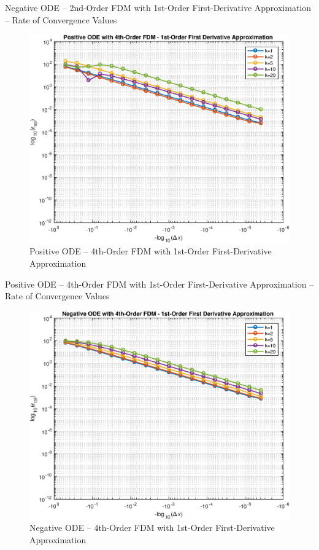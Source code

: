 \documentclass[10pt, reqno]{article}		%
\numberwithin{equation}{section}
\begin{document}
\vfill

\begin{table}[H]
	
	\caption{Negative ODE -- 2nd-Order FDM with 1st-Order First-Derivative Approximation -- Rate of Convergence Values}	
\end{table}

\begin{figure}[H]
	\begin{center}
		\includegraphics[width = 0.76\linewidth]{positive_ode_order_4_fd_order_1}
		\caption{Positive ODE -- 4th-Order FDM with 1st-Order First-Derivative Approximation}	
	\end{center}
\end{figure}

\vfill

\begin{table}[H]
	
	\caption{Positive ODE -- 4th-Order FDM with 1st-Order First-Derivative Approximation -- Rate of Convergence Values}	
\end{table}

\begin{figure}[H]
	\begin{center}
		\includegraphics[width = 0.76\linewidth]{negative_ode_order_4_fd_order_1}
		\caption{Negative ODE -- 4th-Order FDM with 1st-Order First-Derivative Approximation}	
	\end{center}
\end{figure}
\end{document}
